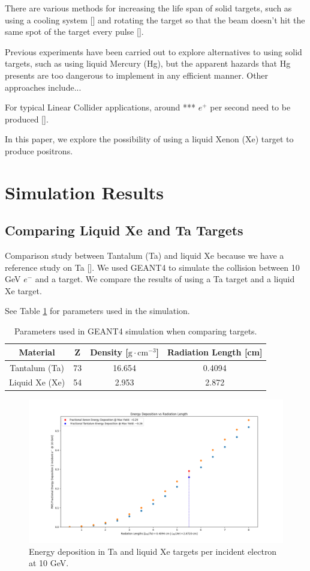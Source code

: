 \documentclass[%
reprint,
amsmath, amssymb,
aps,
floatfix,
]{revtex4-2}
\begin{document}
There are various methods for increasing
the life span of solid targets, such as using a cooling system [] and rotating the target so that the beam doesn't
hit the same spot of the target every pulse [].

Previous experiments have been carried out to explore alternatives to using solid targets, such as using liquid Mercury (Hg),
but the apparent hazards that Hg presents are too dangerous to implement in any efficient manner.
Other approaches include...

For typical Linear Collider applications, around *** $e^+$ per second need to be produced [].

In this paper, we explore the possibility of using a liquid Xenon (Xe) target to produce positrons.

\section{Simulation Results}
\subsection{Comparing Liquid Xe and Ta Targets}
Comparison study between Tantalum (Ta) and liquid Xe because we have a reference study on Ta [].
We used GEANT4 to simulate the collision between 10 GeV $e^-$ and a target.  We compare the results of using a
Ta target and a liquid Xe target.

See Table \ref{tab:G4Params} for parameters used in the simulation.
\begin{table}[h]
    \centering
    \begin{tabular}{cccc}
        \hline \hline
        Material & Z & Density [$\textrm{g} \cdot \textrm{cm}^{-3} $] & Radiation Length [cm] \\
        \hline
        Tantalum (Ta) & 73 & 16.654 & 0.4094 \\
        Liquid Xe (Xe) & 54 & 2.953 & 2.872 \\
        \hline \hline
    \end{tabular}
    \caption{\label{tab:G4Params}Parameters used in GEANT4 simulation when comparing targets.}
\end{table}

\begin{figure}[h]
    \includegraphics[width = \linewidth]{../images/CompDeps.png}
    \caption{\label{fig:EDep}Energy deposition in Ta and liquid Xe targets per incident electron at 10 GeV.}
\end{figure}
\end{document}
